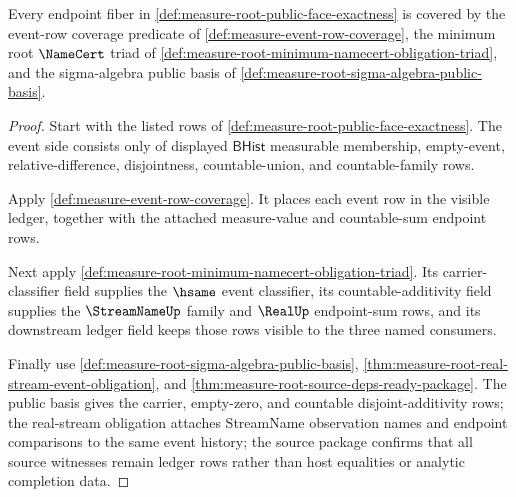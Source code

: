 \begin{theorem}
\label{thm:measure-root-public-face-coverage}
Every endpoint fiber in
\autoref{def:measure-root-public-face-exactness} is covered by the event-row
coverage predicate of \autoref{def:measure-event-row-coverage}, the minimum
root $\NameCert$ triad of
\autoref{def:measure-root-minimum-namecert-obligation-triad}, and the
sigma-algebra public basis of
\autoref{def:measure-root-sigma-algebra-public-basis}.
\end{theorem}
\begin{proof}
Start with the listed rows of
\autoref{def:measure-root-public-face-exactness}. The event side consists
only of displayed $\mathsf{BHist}$ measurable membership, empty-event,
relative-difference, disjointness, countable-union, and countable-family rows.

Apply \autoref{def:measure-event-row-coverage}. It places each event row in
the visible ledger, together with the attached measure-value and countable-sum
endpoint rows.

Next apply
\autoref{def:measure-root-minimum-namecert-obligation-triad}. Its
carrier-classifier field supplies the $\hsame$ event classifier, its
countable-additivity field supplies the $\StreamNameUp$ family and
$\RealUp$ endpoint-sum rows, and its downstream ledger field keeps those rows
visible to the three named consumers.

Finally use \autoref{def:measure-root-sigma-algebra-public-basis},
\autoref{thm:measure-root-real-stream-event-obligation}, and
\autoref{thm:measure-root-source-deps-ready-package}. The public basis gives
the carrier, empty-zero, and countable disjoint-additivity rows; the
real-stream obligation attaches StreamName observation names and endpoint
comparisons to the same event history; the source package confirms that all
source witnesses remain ledger rows rather than host equalities or analytic
completion data.
\end{proof}

